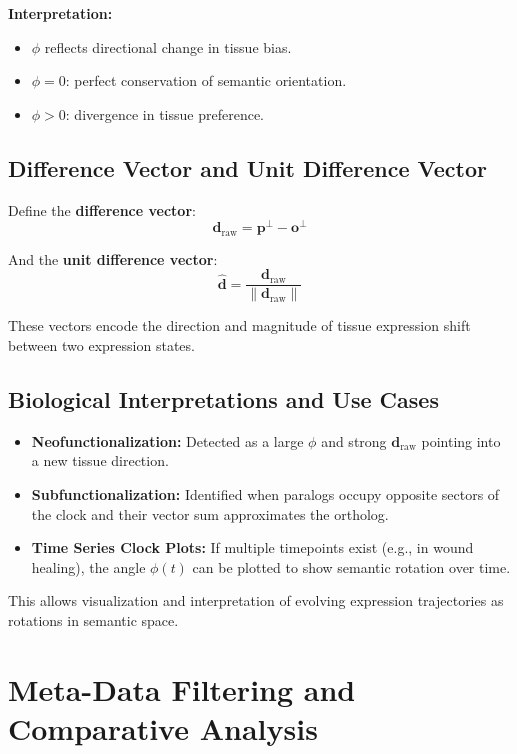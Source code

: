\documentclass[11pt]{article}
\begin{document}
\textbf{Interpretation:}
\begin{itemize}[leftmargin=1.5em]
    \item $\phi$ reflects directional change in tissue bias.
    \item $\phi = 0$: perfect conservation of semantic orientation.
    \item $\phi > 0$: divergence in tissue preference.
\end{itemize}

\subsection{Difference Vector and Unit Difference Vector}

Define the \textbf{difference vector}:
\[
\mathbf{d}_{\text{raw}} = \mathbf{p}^\perp - \mathbf{o}^\perp
\]

And the \textbf{unit difference vector}:
\[
\hat{\mathbf{d}} = \frac{ \mathbf{d}_{\text{raw}} }{ \| \mathbf{d}_{\text{raw}} \| }
\]

These vectors encode the direction and magnitude of tissue expression shift between two expression states.

\subsection{Biological Interpretations and Use Cases}

\begin{itemize}[leftmargin=1.5em]
    \item \textbf{Neofunctionalization:} Detected as a large $\phi$ and strong $\mathbf{d}_{\text{raw}}$ pointing into a new tissue direction.
    \item \textbf{Subfunctionalization:} Identified when paralogs occupy opposite sectors of the clock and their vector sum approximates the ortholog.
    \item \textbf{Time Series Clock Plots:} If multiple timepoints exist (e.g., in wound healing), the angle $\phi(t)$ can be plotted to show semantic rotation over time.
\end{itemize}

This allows visualization and interpretation of evolving expression trajectories as rotations in semantic space.

\section{Meta-Data Filtering and Comparative Analysis}
\end{document}
